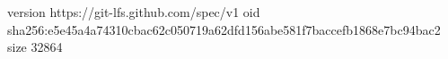 version https://git-lfs.github.com/spec/v1
oid sha256:e5e45a4a74310cbac62c050719a62dfd156abe581f7baccefb1868e7bc94bac2
size 32864
